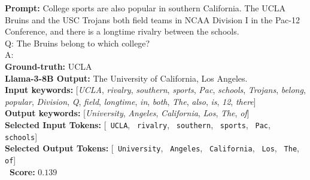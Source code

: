 \clearpage
\begin{tcolorbox}[breakable,title=Example from SQuAD, colback=gray!5!white, colframe=gray!70!black, boxrule=0.6pt, arc=2mm, left=2mm, right=2mm, top=1mm, bottom=1mm]
\footnotesize
\textbf{Prompt:} College sports are also popular in southern California. The UCLA Bruins and the USC Trojans both field teams in NCAA Division I in the Pac-12 Conference, and there is a longtime rivalry between the schools. \\Q: The Bruins belong to which college? \\A:\\[1ex]
\textbf{Ground-truth:} UCLA\\
\textbf{Llama-3-8B Output:} \textcolor{OliveGreen}{The University of California, Los Angeles.}\\

\textbf{Input keywords:} [\textit{UCLA}, \textit{rivalry}, \textit{southern}, \textit{sports}, \textit{Pac}, \textit{schools}, \textit{Trojans}, \textit{belong}, \textit{popular}, \textit{Division}, \textit{Q}, \textit{field}, \textit{longtime}, \textit{in}, \textit{both}, \textit{The}, \textit{also}, \textit{is}, \textit{12}, \textit{there}]\\
\textbf{Output keywords:} [\textit{University}, \textit{Angeles}, \textit{California}, \textit{Los}, \textit{The}, \textit{of}]\\
\textbf{Selected Input Tokens:} [\texttt{ UCLA}, \texttt{ rivalry}, \texttt{ southern}, \texttt{ sports}, \texttt{ Pac}, \texttt{ schools}]\\
\textbf{Selected Output Tokens:} [\texttt{ University}, \texttt{ Angeles}, \texttt{ California}, \texttt{ Los}, \texttt{ The}, \texttt{ of}]\\

\textbf{\method~Score:} $0.139$
\end{tcolorbox}


